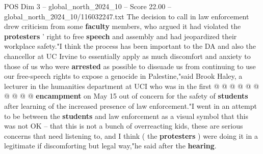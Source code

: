 \begin{textsample}{POS Dim 3 – global\_north\_2024\_10 – Score 22.00 – global\_north\_2024\_10/116032247.txt}
The decision to call in law enforcement drew criticism from some \textbf{faculty} members, who argued it had violated the \textbf{protesters} ' right to free \textbf{speech} and assembly and had jeopardized their workplace safety."I think the process has been important to the DA and also the chancellor at UC Irvine to essentially apply as much discomfort and anxiety to those of us who were \textbf{arrested} as possible to dissuade us from continuing to use our free-speech rights to expose a genocide in Palestine,"said Brook Haley, a lecturer in the humanities department at UCI who was in the first @ @ @ @ @ @ @ @ @ @ \textbf{encampment} on May 15 out of concern for the safety of \textbf{students} after learning of the increased presence of law enforcement."I went in an attempt to be between the \textbf{students} and law enforcement as a visual symbol that this was not OK -- that this is not a bunch of overreacting kids, these are serious concerns that need listening to, and I think ( the \textbf{protesters} ) were doing it in a legitimate if discomforting but legal way,"he said after the \textbf{hearing}.

\end{textsample}

